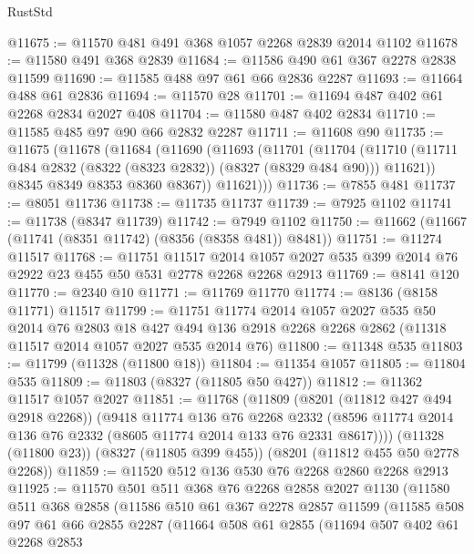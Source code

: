 \begin{lexlean}{RustStd}
\begin{coremodule}
{\begin{coremodule}
{{{{{{{{{{{{{{{{{{{{{{{{{{{{{{{{{{{{{{{{{{{{{{{{{{{{{{@11675 := @11570 @481 @491 @368 @1057 @2268 @2839 @2014 @1102
@11678 := @11580 @491 @368 @2839
@11684 := @11586 @490 @61 @367 @2278 @2838 @11599
@11690 := @11585 @488 @97 @61 @66 @2836 @2287
@11693 := @11664 @488 @61 @2836
@11694 := @11570 @28
@11701 := @11694 @487 @402 @61 @2268 @2834 @2027 @408
@11704 := @11580 @487 @402 @2834
@11710 := @11585 @485 @97 @90 @66 @2832 @2287
@11711 := @11608 @90
@11735 := @11675
    (@11678
      (@11684
        (@11690
          (@11693
            (@11701
              (@11704
                (@11710 (@11711 @484 @2832 (@8322 (@8323 @2832)) (@8327 (@8329 @484 @90))) @11621))
              @8345
              @8349
              @8353
              @8360
              @8367))
          @11621)))
@11736 := @7855 @481
@11737 := @8051 @11736
@11738 := @11735 @11737
@11739 := @7925 @1102
@11741 := @11738 (@8347 @11739)
@11742 := @7949 @1102
@11750 := @11662 (@11667 (@11741 (@8351 @11742) (@8356 (@8358 @481)) @8481))
@11751 := @11274 @11517
@11768 := @11751
    @11517
    @2014
    @1057
    @2027
    @535
    @399
    @2014
    @76
    @2922
    @23
    @455
    @50
    @531
    @2778
    @2268
    @2268
    @2913
@11769 := @8141 @120
@11770 := @2340 @10
@11771 := @11769 @11770
@11774 := @8136 (@8158 @11771) @11517
@11799 := @11751
    @11774
    @2014
    @1057
    @2027
    @535
    @50
    @2014
    @76
    @2803
    @18
    @427
    @494
    @136
    @2918
    @2268
    @2268
    @2862
    (@11318 @11517 @2014 @1057 @2027 @535 @2014 @76)
@11800 := @11348 @535
@11803 := @11799 (@11328 (@11800 @18))
@11804 := @11354 @1057
@11805 := @11804 @535
@11809 := @11803 (@8327 (@11805 @50 @427))
@11812 := @11362 @11517 @1057 @2027
@11851 := @11768
    (@11809
      (@8201 (@11812 @427 @494 @2918 @2268))
      (@9418
        @11774
        @136
        @76
        @2268
        @2332
        (@8596 @11774 @2014 @136 @76 @2332 (@8605 @11774 @2014 @133 @76 @2331 @8617))))
    (@11328 (@11800 @23))
    (@8327 (@11805 @399 @455))
    (@8201 (@11812 @455 @50 @2778 @2268))
@11859 := @11520 @512 @136 @530 @76 @2268 @2860 @2268 @2913
@11925 := @11570
    @501
    @511
    @368
    @76
    @2268
    @2858
    @2027
    @1130
    (@11580
      @511
      @368
      @2858
      (@11586
        @510
        @61
        @367
        @2278
        @2857
        @11599
        (@11585
          @508
          @97
          @61
          @66
          @2855
          @2287
          (@11664
            @508
            @61
            @2855
            (@11694
              @507
              @402
              @61
              @2268
              @2853
}}}}}}}}}}}}}}}}}}}}}}}}}}}}}}}}}}}}}}}}}}}}}}}}}}}}}}
\end{coremodule}}
\end{coremodule}
\end{lexlean}
